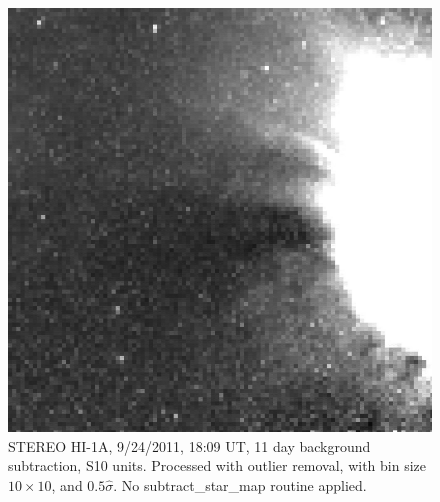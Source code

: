 %
\begin{figure}
  \centering
  \includegraphics[scale=0.5]{../IMAGES/20110924_180901_24h1A_br11_WITH_STARS_0010_05stdev_contrast_32_190.jpg} 
  \caption{STEREO HI-1A, 9/24/2011, 18:09 UT, 11 day background subtraction, S10 units. Processed with outlier removal, with bin size $10 \times 10$, and $0.5 \hat{\sigma}$. No subtract\_star\_map routine applied.}
  \label{fig:fig:hi1a_0010bin_05stdev}
\end{figure}
%
